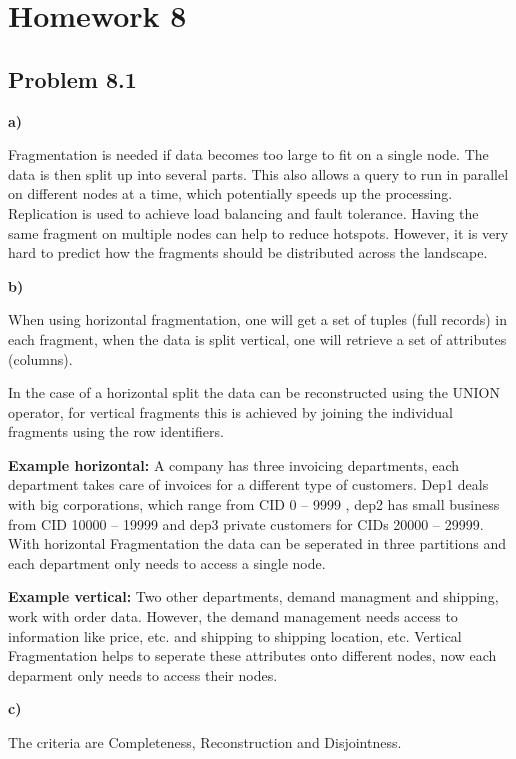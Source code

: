 \documentclass{scrartcl}
\begin{document}
\section*{Homework 8}
\subsection*{Problem 8.1}

\textbf{a)}

Fragmentation is needed if data becomes too large to fit on a single node. The data is then split up into several parts. This also allows a query to run in parallel on different nodes at a time, which potentially speeds up the processing. 
Replication is used to achieve load balancing and fault tolerance. Having the same fragment on multiple nodes can help to reduce \glqq{}hotspots\grqq. However, it is very hard to predict how the fragments should be distributed across the landscape. 

\textbf{b)} 

When using horizontal fragmentation, one will get a set of tuples (full records) in each fragment, when the data is split vertical, one will retrieve a set of attributes (\glqq{}columns\grqq{}). 

In the case of a horizontal split the data can be reconstructed using the UNION operator, for vertical fragments this is achieved by joining the individual fragments using the row identifiers. 

\textbf{Example horizontal:} 
A company has three invoicing departments, each department takes care of invoices for a different type of customers.
Dep1 deals with big corporations, which range from CID 0 -- 9999 , dep2 has small business from CID 10000 -- 19999 and dep3 private customers for CIDs 20000 -- 29999. 
With horizontal Fragmentation the data can be seperated in three partitions and each department only needs to access a single node. 

\textbf{Example vertical:} 
Two other departments, demand managment and shipping, work with order data. 
However, the demand management needs access to information like price, etc. and shipping to shipping location, etc. 
Vertical Fragmentation helps to seperate these attributes onto different nodes, now each deparment only needs to access \glqq{}their\grqq{} nodes. 

\newpage{}

\textbf{c)}

The criteria are Completeness, Reconstruction and Disjointness.
\end{document}
